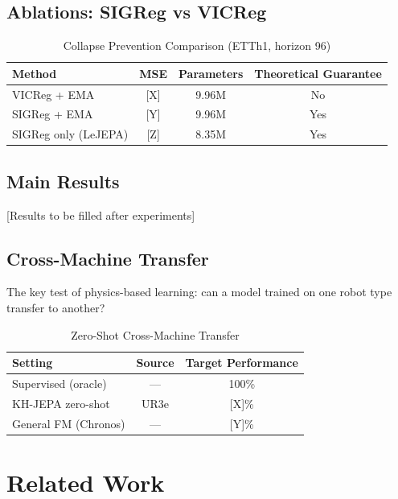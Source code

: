 \documentclass{article}
\begin{document}
\subsection{Ablations: SIGReg vs VICReg}

\begin{table}[h]
\centering
\caption{Collapse Prevention Comparison (ETTh1, horizon 96)}
\small
\begin{tabular}{@{}lccc@{}}
\toprule
\textbf{Method} & \textbf{MSE} & \textbf{Parameters} & \textbf{Theoretical Guarantee} \\
\midrule
VICReg + EMA & [X] & 9.96M & No \\
SIGReg + EMA & [Y] & 9.96M & Yes \\
SIGReg only (LeJEPA) & [Z] & 8.35M & Yes \\
\bottomrule
\end{tabular}
\end{table}

\subsection{Main Results}

[Results to be filled after experiments]

\subsection{Cross-Machine Transfer}

The key test of physics-based learning: can a model trained on one robot type transfer to another?

\begin{table}[h]
\centering
\caption{Zero-Shot Cross-Machine Transfer}
\small
\begin{tabular}{@{}lcc@{}}
\toprule
\textbf{Setting} & \textbf{Source} & \textbf{Target Performance} \\
\midrule
Supervised (oracle) & — & 100\% \\
KH-JEPA zero-shot & UR3e & [X]\% \\
General FM (Chronos) & — & [Y]\% \\
\bottomrule
\end{tabular}
\end{table}

\section{Related Work}
\end{document}
